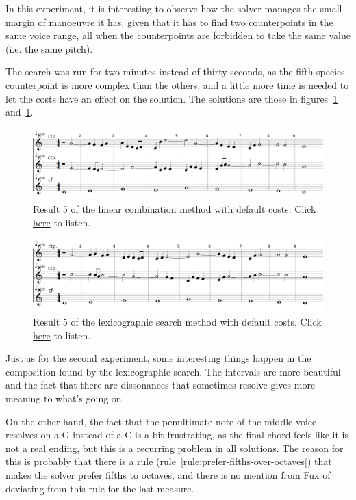 In this experiment, it is interesting to observe how the solver manages the small margin of manoeuvre it has, given that it has to find two counterpoints in the same voice range, all when the counterpoints are forbidden to take the same value (i.e. the same pitch).

The search was run for two minutes instead of thirty seconds, as the fifth species counterpoint is more complex than the others, and a little more time is needed to let the costs have an effect on the solution. The solutions are those in figures~\ref{fig:combili-5sp} and~\ref{fig:combili-5sp}.

\begin{figure}[h]
    \centering
    \includegraphics[width=1\textwidth]{Images/Experiments/linear-combination-5sp.png}
    \caption{Result 5 of the linear combination method with default costs. Click \href{https://youtu.be/Lyi2Tv0eto8}{here} to listen.}
    \label{fig:combili-5sp}
\end{figure}

\begin{figure}[h]
    \centering
    \includegraphics[width=1\textwidth]{Images/Experiments/basic-lexico-5sp.png}
    \caption{Result 5 of the lexicographic search method with default costs. Click \href{https://youtu.be/wYq28XcmpVw}{here} to listen.}
    \label{fig:lexico-5sp}
\end{figure}

Just as for the second experiment, some interesting things happen in the composition found by the lexicographic search. The intervals are more beautiful and the fact that there are dissonances that sometimes resolve gives more meaning to what's going on.

On the other hand, the fact that the penultimate note of the middle voice resolves on a G instead of a C is a bit frustrating, as the final chord feels like it is not a real ending, but this is a recurring problem in all solutions. The reason for this is probably that there is a rule (rule~\ref{rule:prefer-fifths-over-octaves}) that makes the solver prefer fifths to octaves, and there is no mention from Fux of deviating from this rule for the last measure.

